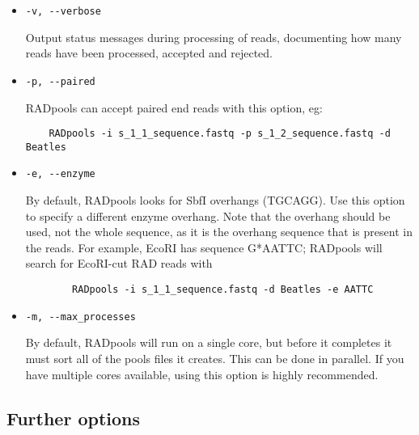 \documentclass[a4paper]{article}
\begin{document}
\begin{itemize}
    \item \verb|-v, --verbose|

Output status messages during processing of reads, documenting how many reads have been processed, accepted and rejected.

    \item \verb|-p, --paired|

RADpools can accept paired end reads with this option, eg:
\begin{verbatim}
    RADpools -i s_1_1_sequence.fastq -p s_1_2_sequence.fastq -d Beatles
\end{verbatim}

    \item \verb|-e, --enzyme|
    
    By default, RADpools looks for SbfI overhangs (TGCAGG). Use this option to specify a different enzyme overhang. Note that the overhang should be used, not the whole sequence, as it is the overhang sequence that is present in the reads. For example, EcoRI has sequence G*AATTC; RADpools will search for EcoRI-cut RAD reads with
    \begin{verbatim}
        RADpools -i s_1_1_sequence.fastq -d Beatles -e AATTC
    \end{verbatim}

    \item \verb|-m, --max_processes|
    
    By default, RADpools will run on a single core, but before it completes it must sort all of the pools files it creates. This can be done in parallel. If you have multiple cores available, using this option is highly recommended.

\end{itemize}

\subsection{Further options}
\end{document}
